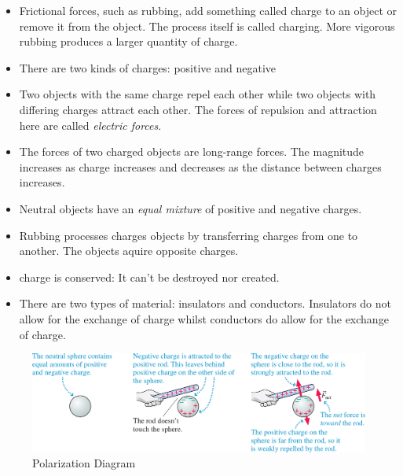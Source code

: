 \documentclass{report}   
\begin{document}
\begin{itemize}
  \item Frictional forces, such as rubbing, add something called charge to an object or remove it from the object. The process itself is called charging. More vigorous rubbing produces a larger quantity of charge.
  \item There are two kinds of charges: positive and negative
  \item Two objects with the same charge repel each other while two objects with differing charges attract each other. The forces of repulsion and attraction here are called \textit{electric forces}. 
  \item The forces of two charged objects are long-range forces. The magnitude increases as charge increases and decreases as the distance between charges increases. 
  \item Neutral objects have an \textit{equal mixture} of positive and negative charges. 
  \item Rubbing processes charges objects by transferring charges from one to another. The objects aquire opposite charges. 
  \item charge is conserved: It can't be destroyed nor created.
  \item There are two types of material: insulators and conductors. Insulators do not allow for the exchange of charge whilst conductors do allow for the exchange of charge. 
\end{itemize}

\begin{figure}
  \includegraphics[width=1\textwidth]{figures/polarization_diagram.jpg}
  \caption{Polarization Diagram}
  \label{fig:diagram}
\end{figure}
\end{document}
